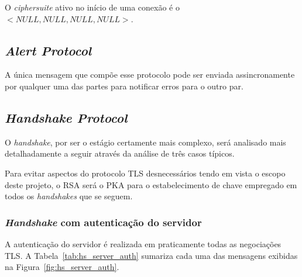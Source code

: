 O \emph{ciphersuite} ativo no início de uma conexão é o $<NULL,NULL,NULL,NULL>$.

\subsection{\emph{Alert Protocol}}

A única mensagem que compõe esse protocolo pode ser enviada assincronamente por 
qualquer uma das partes para notificar erros para o outro par.

\subsection{\emph{Handshake Protocol}}

O \emph{handshake}, por ser o estágio certamente mais complexo, será analisado
mais detalhadamente a seguir através da análise de três casos típicos.

Para evitar aspectos do protocolo TLS desnecessários tendo em vista o escopo 
deste projeto, o \acs{RSA} será o PKA para o estabelecimento de chave empregado
em todos os \emph{handshakes} que se seguem.

\subsubsection{\emph{Handshake} com autenticação do servidor}

A autenticação do servidor é realizada em praticamente todas as negociações
TLS. A Tabela~\vref{tab:hs_server_auth} sumariza cada uma das mensagens
exibidas na Figura~\ref{fig:hs_server_auth}.


